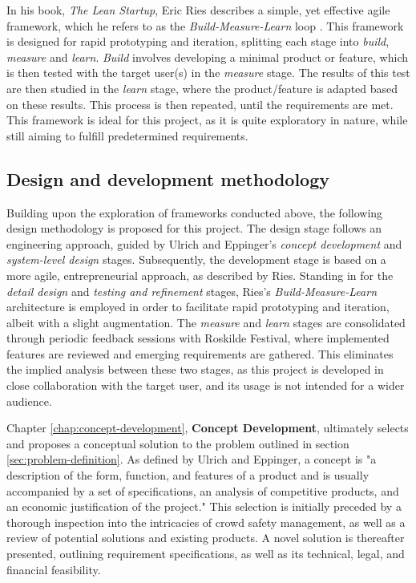 In his book, \textit{The Lean Startup}, Eric Ries describes a simple, yet effective agile framework, which he refers to as the \textit{Build-Measure-Learn} loop \cite{lean_startup}. This framework is designed for rapid prototyping and iteration, splitting each stage into \textit{build}, \textit{measure} and \textit{learn}. \textit{Build} involves developing a minimal product or feature, which is then tested with the target user(s) in the \textit{measure} stage. The results of this test are then studied in the \textit{learn} stage, where the product/feature is adapted based on these results. This process is then repeated, until the requirements are met. This framework is ideal for this project, as it is quite exploratory in nature, while still aiming to fulfill predetermined requirements.

\subsection{Design and development methodology}

Building upon the exploration of frameworks conducted above, the following design methodology is proposed for this project. The design stage follows an engineering approach, guided by Ulrich and Eppinger's \textit{concept development} and \textit{system-level design} stages. Subsequently, the development stage is based on a more agile, entrepreneurial approach, as described by Ries. Standing in for the \textit{detail design} and \textit{testing and refinement} stages, Ries's \textit{Build-Measure-Learn} architecture is employed in order to facilitate rapid prototyping and iteration, albeit with a slight augmentation. The \textit{measure} and \textit{learn} stages are consolidated through periodic feedback sessions with Roskilde Festival, where implemented features are reviewed and emerging requirements are gathered. This eliminates the implied analysis between these two stages, as this project is developed in close collaboration with the target user, and its usage is not intended for a wider audience.

Chapter \ref{chap:concept-development}, \textbf{Concept Development}, ultimately selects and proposes a conceptual solution to the problem outlined in section \ref{sec:problem-definition}. As defined by Ulrich and Eppinger, a concept is "a description of the form, function, and features of a product and is usually accompanied by a set of specifications, an analysis of competitive products, and an economic justification of the project." \cite{ulrich_eppinger} This selection is initially preceded by a thorough inspection into the intricacies of crowd safety management, as well as a review of potential solutions and existing products. A novel solution is thereafter presented, outlining requirement specifications, as well as its technical, legal, and financial feasibility.

